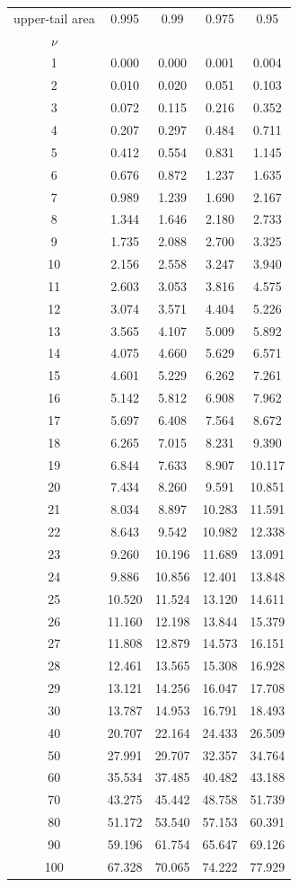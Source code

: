 \begin{center}
\small
\begin{tabular}{c|cccc}
\toprule
upper-tail area & 0.995 & 0.99 & 0.975 & 0.95 \\
$\nu$ &  &  &  &  \\
\midrule
1 & 0.000 & 0.000 & 0.001 & 0.004 \\
2 & 0.010 & 0.020 & 0.051 & 0.103 \\
3 & 0.072 & 0.115 & 0.216 & 0.352 \\
4 & 0.207 & 0.297 & 0.484 & 0.711 \\
5 & 0.412 & 0.554 & 0.831 & 1.145 \\
6 & 0.676 & 0.872 & 1.237 & 1.635 \\
7 & 0.989 & 1.239 & 1.690 & 2.167 \\
8 & 1.344 & 1.646 & 2.180 & 2.733 \\
9 & 1.735 & 2.088 & 2.700 & 3.325 \\
10 & 2.156 & 2.558 & 3.247 & 3.940 \\
11 & 2.603 & 3.053 & 3.816 & 4.575 \\
12 & 3.074 & 3.571 & 4.404 & 5.226 \\
13 & 3.565 & 4.107 & 5.009 & 5.892 \\
14 & 4.075 & 4.660 & 5.629 & 6.571 \\
15 & 4.601 & 5.229 & 6.262 & 7.261 \\
16 & 5.142 & 5.812 & 6.908 & 7.962 \\
17 & 5.697 & 6.408 & 7.564 & 8.672 \\
18 & 6.265 & 7.015 & 8.231 & 9.390 \\
19 & 6.844 & 7.633 & 8.907 & 10.117 \\
20 & 7.434 & 8.260 & 9.591 & 10.851 \\
21 & 8.034 & 8.897 & 10.283 & 11.591 \\
22 & 8.643 & 9.542 & 10.982 & 12.338 \\
23 & 9.260 & 10.196 & 11.689 & 13.091 \\
24 & 9.886 & 10.856 & 12.401 & 13.848 \\
25 & 10.520 & 11.524 & 13.120 & 14.611 \\
26 & 11.160 & 12.198 & 13.844 & 15.379 \\
27 & 11.808 & 12.879 & 14.573 & 16.151 \\
28 & 12.461 & 13.565 & 15.308 & 16.928 \\
29 & 13.121 & 14.256 & 16.047 & 17.708 \\
30 & 13.787 & 14.953 & 16.791 & 18.493 \\
40 & 20.707 & 22.164 & 24.433 & 26.509 \\
50 & 27.991 & 29.707 & 32.357 & 34.764 \\
60 & 35.534 & 37.485 & 40.482 & 43.188 \\
70 & 43.275 & 45.442 & 48.758 & 51.739 \\
80 & 51.172 & 53.540 & 57.153 & 60.391 \\
90 & 59.196 & 61.754 & 65.647 & 69.126 \\
100 & 67.328 & 70.065 & 74.222 & 77.929 \\
\bottomrule
\end{tabular}
\end{center}

